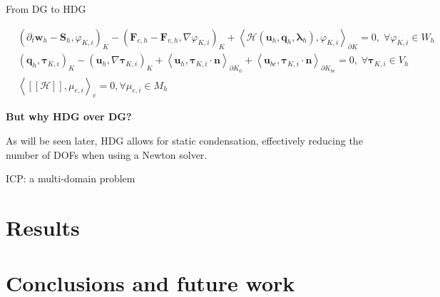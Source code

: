\documentclass[24pt,t,table, aspectratio=169]{beamer}
\newcommand{\vecu}{\mathbf{u}}
\newcommand{\vecF}{\mathbf{F}}
\newcommand{\vecS}{\mathbf{S}}
\newcommand{\vecq}{\mathbf{q}}
\newcommand{\vecw}{\mathbf{w}}
\newcommand{\vectau}{\boldsymbol{\tau}}
\newcommand{\vecHcal}{\boldsymbol{\mathcal{H}}}
\newcommand{\veclambda}{\boldsymbol{\lambda}}
\newcommand{\vecn}{\mathbf{n}}
\begin{document}
\begin{frame}{From DG to HDG}
{
\begin{framed}
\small
\begin{equation*}
\begin{aligned}
& \left(\partial_t \vecw_{h} - \vecS_{h}, \varphi_{K,i} \right)_{K} - \left(\vecF_{c, {h}} - \vecF_{v, {h}}, \nabla \varphi_{K,i} \right)_{K} + \left\langle \vecHcal(\vecu_h, \vecq_h, \veclambda_h), \varphi_{K,i} \right\rangle_{\partial K} = 0, \; \forall \varphi_{K,i} \in W_h\\
& \left(\vecq_h, \vectau_{K,i}\right)_{K} - \left(\vecu_h, \nabla \vectau_{K,i}\right)_{K} + \left\langle \vecu_h, \vectau_{K,i} \cdot \vecn \right\rangle_{\partial K_0} + \left\langle \vecu_{bc}, \vectau_{K,i} \cdot \vecn \right\rangle_{\partial K_{bc}} = 0,\; \forall \vectau_{K,i} \in V_h\\
& \left\langle[[\vecHcal]], \mu_{e,i} \right\rangle_{e} = 0, \forall \mu_{e,i} \in M_h
\end{aligned}
\end{equation*}
\end{framed}

\begin{center}
\textbf{But why HDG over DG?}
\end{center}

}

{
As will be seen later, HDG allows for static condensation, effectively reducing the number of DOFs when using a Newton solver.
}

\end{frame}

\begin{frame}{ICP: a multi-domain problem}



\end{frame}

\section{Results}

\section{Conclusions and future work}
\end{document}
